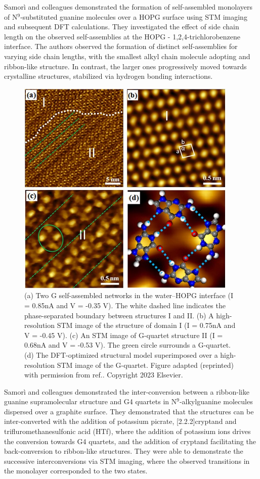 Samor\`{i} and colleagues demonstrated the formation of self-assembled monolayers of N$^9$-substituted guanine molecules over a HOPG surface using STM imaging and subsequent DFT calculations.\supercite{ciesielski_nanopatterning_2010} They investigated the effect of side chain length on the observed self-assemblies at the HOPG - 1,2,4-trichlorobenzene interface. The authors observed the formation of distinct self-assemblies for varying side chain lengths, with the smallest alkyl chain molecule adopting and ribbon-like structure. In contrast, the larger ones progressively moved towards crystalline structures, stabilized via hydrogen bonding interactions.
\begin{figure}
    \centering
    \includegraphics{Introduction/Figures/Figure6.png}
    \caption[Representative structures for guanine self-assemblies over graphene surface]{(a) Two G self-assembled networks in the water–HOPG interface (I = 0.85nA and V = -0.35 V). The white dashed line indicates the phase-separated boundary between structures I and II. (b) A high-resolution STM image of the structure of domain I (I = 0.75nA and V = -0.45 V). (c) An STM image of G-quartet structure II (I = 0.68nA and V = -0.53 V). The green circle surrounds a G-quartet. (d) The DFT-optimized structural model superimposed over a high-resolution STM image of the G-quartet. Figure adapted (reprinted) with permission from ref.\supercite{xu_directional_2021}. Copyright 2023 Elsevier.}
    \label{fig:enter-label}
\end{figure}

Samor\`{i} and colleagues demonstrated the inter-conversion between a ribbon-like guanine supramolecular structure and G4 quartets in N$^9$-alkylguanine molecules dispersed over a graphite surface\supercite{ciesielski_dynamers_2010}. They demonstrated that the structures can be inter-converted with the addition of potassium picrate, [2.2.2]cryptand and trifluromethanesulfonic acid (HTf), where the addition of potassium ions drives the conversion towards G4 quartets, and the addition of cryptand facilitating the back-conversion to ribbon-like structures. They were able to demonstrate the successive interconversions via STM imaging, where the observed transitions in the monolayer corresponded to the two states.

